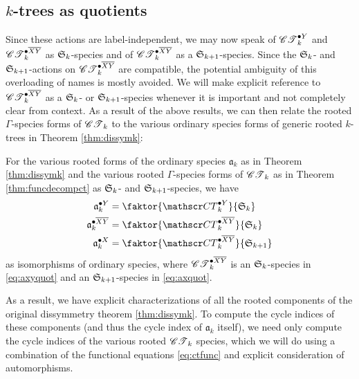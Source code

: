 \documentclass[sectionflow,singlespace,twoside,boldmathhdr,draft]{brandiss} %
\numberwithin{section}{chapter}
\numberwithin{figure}{chapter}
\begin{document}
\subsection{$k$-trees as quotients}\label{ss:ktquot}
Since these actions are label-independent, we may now speak of $\pointed[Y]{\specname{CT}}_{k}$ and $\pointed[\overline{XY}]{\specname{CT}}_{k}$ as $\symgp{k}$-species and of $\pointed[\overline{XY}]{\specname{CT}}_{k}$ as a $\symgp{k+1}$-species.
Since the $\symgp{k}$- and $\symgp{k+1}$-actions on $\pointed[\overline{XY}]{\specname{CT}}_{k}$ are compatible, the potential ambiguity of this overloading of names is mostly avoided.
We will make explicit reference to $\pointed[\overline{XY}]{\specname{CT}}_{k}$ as a $\symgp{k}$- or $\symgp{k+1}$-species whenever it is important and not completely clear from context.
As a result of the above results, we can then relate the rooted $\Gamma$-species forms of $\specname{CT}_{k}$ to the various ordinary species forms of generic rooted $k$-trees in Theorem \ref{thm:dissymk}:
\begin{theorem}
  \label{thm:arootquot}
  For the various rooted forms of the ordinary species $\mathfrak{a}_{k}$ as in Theorem \ref{thm:dissymk} and the various rooted $\Gamma$-species forms of $\specname{CT}_{k}$ as in Theorem \ref{thm:funcdecompct} as $\symgp{k}$- and $\symgp{k+1}$-species, we have
  \begin{subequations}
    \label{eq:arootquot}
    \begin{align}
      \pointed[Y]{\mathfrak{a}}_{k} &= \faktor{\pointed[Y]{\specname{CT}}_{k}}{\symgp{k}} \label{eq:ayquot} \\
      \pointed[\overline{XY}]{\mathfrak{a}}_{k} &= \faktor{\pointed[\overline{XY}]{\specname{CT}}_{k}}{\symgp{k}} \label{eq:axyquot} \\
      \pointed[X]{\mathfrak{a}}_{k} &= \faktor{\pointed[\overline{XY}]{\specname{CT}}_{k}}{\symgp{k+1}} \label{eq:axquot}
    \end{align}
  \end{subequations}
  as isomorphisms of ordinary species, where $\pointed[\overline{XY}]{\specname{CT}}_{k}$ is an $\symgp{k}$-species in \eqref{eq:axyquot} and an $\symgp{k+1}$-species in \eqref{eq:axquot}.
\end{theorem}

As a result, we have explicit characterizations of all the rooted components of the original dissymmetry theorem \ref{thm:dissymk}.
To compute the cycle indices of these components (and thus the cycle index of $\mathfrak{a}_{k}$ itself), we need only compute the cycle indices of the various rooted $\specname{CT}_{k}$ species, which we will do using a combination of the functional equations \eqref{eq:ctfunc} and explicit consideration of automorphisms.
\end{document}
